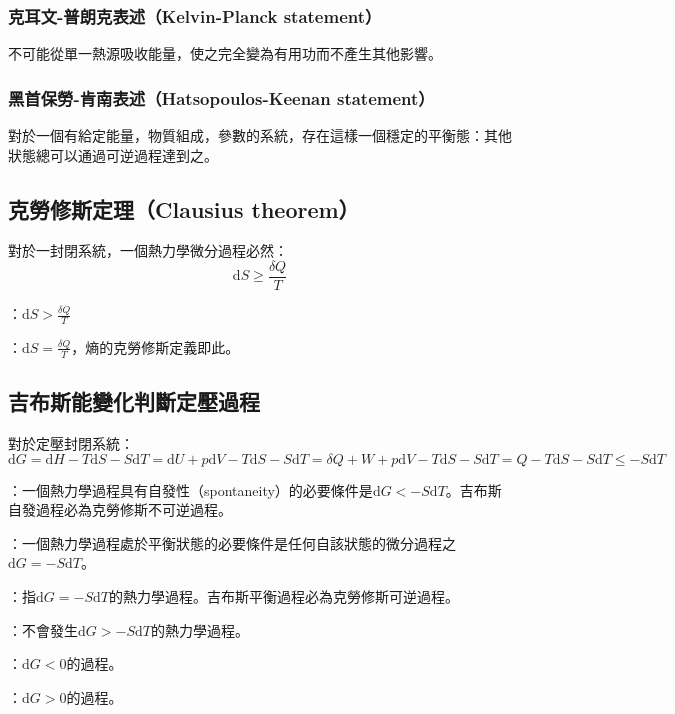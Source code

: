 \documentclass[a4paper,12pt]{report}
\begin{document}
\subsubsection{克耳文-普朗克表述（Kelvin-Planck statement）}
不可能從單一熱源吸收能量，使之完全變為有用功而不產生其他影響。
\subsubsection{黑首保勞-肯南表述（Hatsopoulos-Keenan statement）}
對於一個有給定能量，物質組成，參數的系統，存在這樣一個穩定的平衡態：其他狀態總可以通過可逆過程達到之。
\subsection{克勞修斯定理（Clausius theorem）}
對於一封閉系統，一個熱力學微分過程必然：
\[\mathrm{d}S \geq \frac{\delta Q}{T}\]
\bit
\item {}：$\mathrm{d}S > \frac{\delta Q}{T}$
\item {}：$\mathrm{d}S = \frac{\delta Q}{T}$，熵的克勞修斯定義即此。
\eit
\subsection{吉布斯能變化判斷定壓過程}
對於定壓封閉系統：
\[\mathrm{d} G = \mathrm{d} H - T \mathrm{d} S - S\mathrm{d} T = \mathrm{d} U + p\mathrm{d} V - T \mathrm{d} S - S\mathrm{d} T = \delta Q + W + p\mathrm{d} V - T \mathrm{d} S - S\mathrm{d} T = Q - T \mathrm{d} S - S\mathrm{d} T \leq - S\mathrm{d} T\]
\bit
\item {}：一個熱力學過程具有自發性（spontaneity）的必要條件是$\mathrm{d} G < - S\mathrm{d} T$。吉布斯自發過程必為克勞修斯不可逆過程。
\item {}：一個熱力學過程處於平衡狀態的必要條件是任何自該狀態的微分過程之$\mathrm{d} G = - S\mathrm{d} T$。
\item {}：指$\mathrm{d} G = - S\mathrm{d} T$的熱力學過程。吉布斯平衡過程必為克勞修斯可逆過程。
\item {}：不會發生$\mathrm{d} G > - S\mathrm{d} T$的熱力學過程。
\item {}：$\mathrm{d}G<0$的過程。
\item {}：$\mathrm{d}G>0$的過程。
\eit
\end{document}
